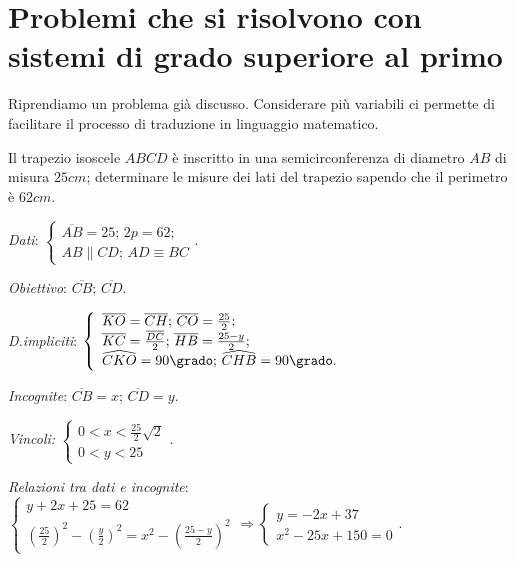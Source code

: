 \section{Problemi che si risolvono con sistemi di grado superiore al primo}

Riprendiamo un problema già discusso. Considerare più variabili ci permette di facilitare il processo di traduzione in linguaggio matematico.

\begin{problema}
Il trapezio isoscele $ABCD$ è inscritto in una semicirconferenza di diametro $AB$ di misura $25\unit{cm}$; determinare le misure dei lati del trapezio sapendo che il perimetro è $62\unit{cm}$.
\end{problema}
\begin{multicols}{2}
\emph{Dati}: $\left\{\begin{array}{l}\overline{AB}=25\text{; }2p=62;\\
AB\parallel CD\text{; }AD\equiv BC\end{array}\right.$.

\emph{Obiettivo}: $\overline{CB}$; $\overline{CD}$.

\emph{D.impliciti}: $\left\{\begin{array}{l}
\overline{KO}=\overline{CH}\text{; }\overline{CO}=\frac{25} 2;\\ \overline{KC}=\frac{\overline{DC}} 2\text{; }\overline{HB}=\frac{25-y} 2;\\ \widehat{CKO}=90\grado\text{; }\widehat{CHB}=90\grado.\end{array}\right.$

\emph{Incognite}: $\overline{CB}=x$; $\overline{CD}=y$.

\emph{Vincoli:} $\left\{\begin{array}{l}0<x<\frac{25} 2\sqrt 2\\0<y<25 \end{array}\right.$.
\begin{center}

\end{center}
\end{multicols}

\emph{Relazioni tra dati e incognite}:
$ \left\{\begin{array}{l}{y+2x+25=62}\\{\left(\frac{25} 2\right)^2-\left(\frac y 2\right)^2=x^2-\left(\frac{25-y} 2\right)^2}\end{array}\right. \Rightarrow \left\{\begin{array}{l}{y=-2x+37}\\{x^2-25x+150=0}\end{array}\right..$

